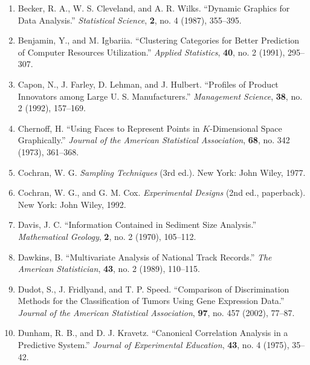 
\begin{center}
\label{bib:1}
{ }
\end{center}

\begin{enumerate}
\item Becker, R. A., W. S. Cleveland, and A. R. Wilks. ``Dynamic Graphics for Data Analysis.'' \textit{Statistical Science}, \textbf{2}, no. 4 (1987), 355--395.

\item Benjamin, Y., and M. Igbariia. ``Clustering Categories for Better Prediction of Computer Resources Utilization.'' \textit{Applied Statistics}, \textbf{40}, no. 2 (1991), 295--307.

\item Capon, N., J. Farley, D. Lehman, and J. Hulbert. ``Profiles of Product Innovators among Large U. S. Manufacturers.'' \textit{Management Science}, \textbf{38}, no. 2 (1992), 157--169.

\item Chernoff, H. ``Using Faces to Represent Points in $K$-Dimensional Space Graphically.'' \textit{Journal of the American Statistical Association}, \textbf{68}, no. 342 (1973), 361--368.

\item Cochran, W. G. \textit{Sampling Techniques} (3rd ed.). New York: John Wiley, 1977.

\item Cochran, W. G., and G. M. Cox. \textit{Experimental Designs} (2nd ed., paperback). New York: John Wiley, 1992.

\item Davis, J. C. ``Information Contained in Sediment Size Analysis.'' \textit{Mathematical Geology}, \textbf{2}, no. 2 (1970), 105--112.

\item Dawkins, B. ``Multivariate Analysis of National Track Records.'' \textit{The American Statistician}, \textbf{43}, no. 2 (1989), 110--115.

\item Dudot, S., J. Fridlyand, and T. P. Speed. ``Comparison of Discrimination Methods for the Classification of Tumors Using Gene Expression Data.'' \textit{Journal of the American Statistical Association}, \textbf{97}, no. 457 (2002), 77--87.

\item Dunham, R. B., and D. J. Kravetz. ``Canonical Correlation Analysis in a Predictive System.'' \textit{Journal of Experimental Education}, \textbf{43}, no. 4 (1975), 35--42.


\end{enumerate}
